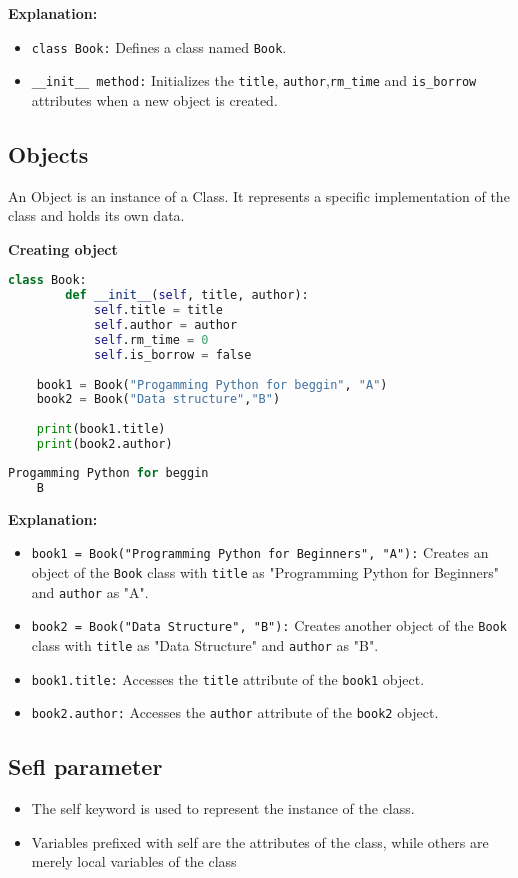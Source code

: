 \textbf{Explanation:}
\begin{itemize}
	\item \texttt{class Book:} Defines a class named \texttt{Book}.
	\item \texttt{\_\_init\_\_ method:} Initializes the \texttt{title}, \texttt{author},\texttt{rm\_time} and \texttt{is\_borrow} attributes when a new object is created.
\end{itemize}

\subsection{Objects}
An Object is an instance of a Class. It represents a specific implementation of the class and holds its own data.

\textbf{Creating object}
\begin{lstlisting}[language=python, caption={creating object}]
	class Book:
		def __init__(self, title, author):
			self.title = title
			self.author = author
			self.rm_time = 0
			self.is_borrow = false
	
	book1 = Book("Progamming Python for beggin", "A")
	book2 = Book("Data structure","B")
	
	print(book1.title)
	print(book2.author)
\end{lstlisting}

\begin{lstlisting}[language=python,caption={Output object}]
	Progamming Python for beggin
	B
\end{lstlisting}

\textbf{Explanation:}
\begin{itemize}
	\item \texttt{book1 = Book("Programming Python for Beginners", "A"):} Creates an object of the \texttt{Book} class with \texttt{title} as "Programming Python for Beginners" and \texttt{author} as "A".
	\item \texttt{book2 = Book("Data Structure", "B"):} Creates another object of the \texttt{Book} class with \texttt{title} as "Data Structure" and \texttt{author} as "B".
	\item \texttt{book1.title:} Accesses the \texttt{title} attribute of the \texttt{book1} object.
	\item \texttt{book2.author:} Accesses the \texttt{author} attribute of the \texttt{book2} object.
\end{itemize}

\subsection{Sefl parameter}
\begin{itemize}
	\item The self keyword is used to represent the instance of the class.
	\item Variables prefixed with self are the attributes of the class, while others are merely local variables of the class
\end{itemize}

